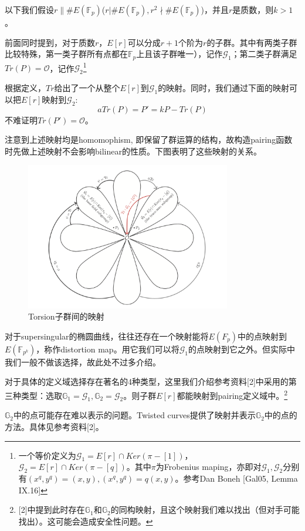 \documentclass[12pt]{article}
\newcommand{\ec}{椭圆曲线}
\newcommand{\oo}{\mathcal{O}}
\newcommand{\fp}{\mathbb{F}_p}
\newcommand{\fpk}{\mathbb{F}_{p^k}}
\begin{document}
以下我们假设$r\| \# E(\fp)$($r|\# E(\fp), r^2 \nmid \# E(\fp)$)，并且$r$是质数，则$k>1$。

前面同时提到，对于质数$r$，$E[r]$可以分成$r+1$个阶为$r$的子群。其中有两类子群比较特殊，第一类子群所有点都在$\fp$上且该子群唯一），记作$\mathcal{G}_1$；第二类子群满足$Tr(P)= \oo$，记作$\mathcal{G}_2$\footnote{一个等价定义为$\mathcal{G}_1 = E[r] \cap Ker(\pi-[1])$，$\mathcal{G}_2 = E[r] \cap Ker(\pi-[q])$。其中$\pi$为Frobenius maping，亦即对$\mathcal{G}_1, \mathcal{G}_2$分别有$(x^q,y^q)=(x,y), (x^q,y^q)=q(x,y)$。参考Dan Boneh [Gal05, Lemma IX.16]}

根据定义，$Tr$给出了一个从整个$E[r]$到$\mathcal{G}_1$的映射。同时，我们通过下面的映射可以把$E[r]$映射到$\mathcal{G_2}$:
$$aTr(P) = 	P' = kP-Tr(P)$$
不难证明$Tr(P') = \oo$。

注意到上述映射均是homomophism, 即保留了群运算的结构，故构造pairing函数时先做上述映射不会影响bilinear的性质。下图表明了这些映射的关系。
\begin{figure}[H]
	\centering
	\label{fig:torsion}
	\includegraphics[width=0.8\textwidth]{../common/torsion.png}
	\caption{Torsion子群间的映射}
\end{figure}
对于supersingular的\ec，往往还存在一个映射能将$E(F_p)$中的点映射到$E(\fpk)$，称作distortion map。用它我们可以将$\mathcal{G}_1$的点映射到它之外。但实际中我们一般不做该选择，故此处不过多介绍。

对于具体的定义域选择存在著名的4种类型，这里我们介绍参考资料[2]中采用的第三种类型：选取$\mathbb{G}_1 = \mathcal{G}_1, \mathbb{G}_2 = \mathcal{G}_2$。则子群$E[r]$都能映射到pairing定义域中。\footnote{[2]中提到此时存在$\mathbb{G}_1$和$\mathbb{G}_2$的同构映射，且这个映射我们难以找出（但对手可能找出）。这可能会造成安全性问题。}

$\mathbb{G}_2$中的点可能存在难以表示的问题。Twisted curves提供了映射并表示$\mathbb{G}_2$中的点的方法。具体见参考资料[2]。
\end{document}
